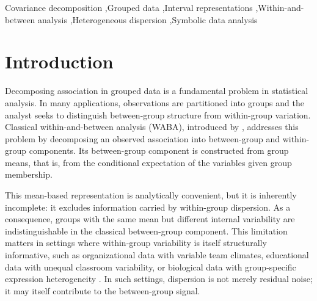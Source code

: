 \documentclass[preprint, times, 12pt, authoryear]{elsarticle}
\begin{document}
\begin{frontmatter}
\begin{keyword}
	Covariance decomposition \sep Grouped data \sep Interval representations \sep Within-and-between analysis \sep Heterogeneous dispersion \sep Symbolic data analysis
\end{keyword}

\end{frontmatter}

\newpage
\tableofcontents
\newpage
\section{Introduction}

Decomposing association in grouped data is a fundamental problem in statistical analysis. In many applications, observations are partitioned into groups and the analyst seeks to distinguish between-group structure from within-group variation. Classical within-and-between analysis (WABA), introduced by \citet{dansereau1984theory}, addresses this problem by decomposing an observed association into between-group and within-group components. Its between-group component is constructed from group means, that is, from the conditional expectation of the variables given group membership.

This mean-based representation is analytically convenient, but it is inherently incomplete: it excludes information carried by within-group dispersion. As a consequence, groups with the same mean but different internal variability are indistinguishable in the classical between-group component. This limitation matters in settings where within-group variability is itself structurally informative, such as organizational data with variable team climates, educational data with unequal classroom variability, or biological data with group-specific expression heterogeneity \citep{yamal2015prediction}. In such settings, dispersion is not merely residual noise; it may itself contribute to the between-group signal.
\end{document}
